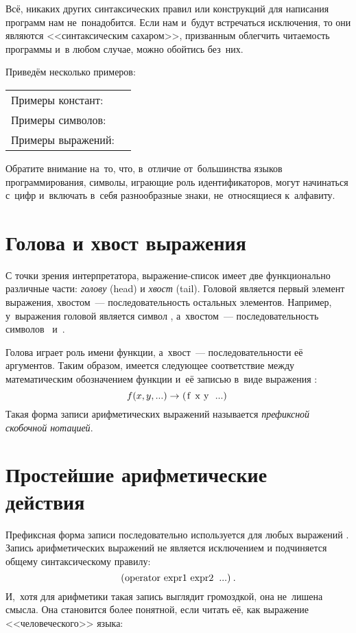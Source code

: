Всё, никаких других синтаксических правил или конструкций для написания программ нам не~понадобится. Если нам и~будут встречаться исключения, то они являются <<синтаксическим сахаром>>, призванным облегчить читаемость программы и~в любом случае, можно обойтись без~них.

Приведём несколько примеров:

\smallskip
\begin{tabular}{>{\comment\raggedright}p{}p{}}
  Примеры констант: & \parbox{0.7\textwidth}{}\\
  Примеры символов: & \parbox{0.7\textwidth}{}\\
  Примеры выражений: & \parbox[t]{0.7\textwidth}{\\ } 
\end{tabular}
\smallskip

Обратите внимание на~то, что, в~отличие от~большинства языков программирования, символы, играющие роль идентификаторов, могут начинаться с~цифр и~включать в~себя разнообразные знаки, не~относящиеся к~алфавиту.

\section{Голова и хвост выражения}%
%
С точки зрения интерпретатора, выра\-жение-список имеет две функционально различные части: \emph{голову} (head) и \emph{хвост} (tail). Головой является первый элемент выражения, хвостом~--- последовательность остальных элементов. Например, у~выражения  головой является символ , а~хвостом~--- последовательность символов ~и~.{\par}

Голова играет роль имени функции, а~хвост~--- последовательности её аргументов. Таким образом, имеется следующее соответствие между математическим обозначением функции и~её записью в~виде выражения \Scheme:
\begin{equation*}
f (x, y,...) \to  \text{\s{(f x y ...)}}
\end{equation*}
Такая форма записи арифметических выражений называется \emph{префиксной скобочной нотацией}.

\section[4]{Простейшие арифметические действия}%
%
Префиксная форма записи последовательно используется для любых выражений \Scheme. Запись арифметических выражений не является исключением и подчиняется общему синтаксическому правилу:
$$
\text{\s{(operator expr1 expr2 ...)}}.
$$
И,~хотя для арифметики такая запись выглядит громоздкой, она не~лишена смысла. Она становится более понятной, если читать её, как выражение <<человеческого>> языка:

